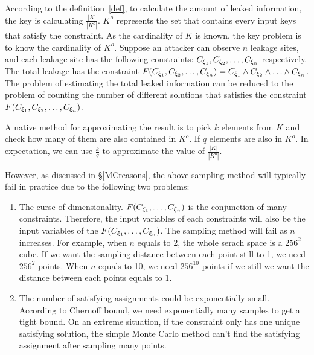 According to the definition~\ref{def}, to calculate the amount of leaked 
information, the key is calculating $\frac{|K|}{|K^o|}$. $K^o$ represents
the set that contains every input keys that satisfy the constraint. As the 
cardinality of $K$ is known, the key problem is to know the cardinality of
$K^o$. Suppose an attacker can observe $n$ leakage sites, and each leakage site has
the following constraints: $C_{{\xi}_{1}}, C_{{\xi}_{2}}, \ldots, C_{{\xi}_{n}}$ respectively. 
The total leakage has the constraint 
$F(C_{{\xi}_{1}},C_{{\xi}_{2}},\ldots,C_{{\xi}_{n}}) = C_{{\xi}_{1}} \land C_{{\xi}_{2}} 
\land \ldots \land C_{{\xi}_{n}}$. The problem of estimating the total leaked information 
can be reduced to the problem of counting the number of different solutions 
that satisfies the constraint $F(C_{{\xi}_{1}},C_{{\xi}_{2}},\ldots,C_{{\xi}_{n}})$. 

A native method for approximating 
the result is to pick $k$ elements from $K$ and check how many of them are also
contained in $K^o$. If $q$ elements are also in $K^o$. In expectation, we can
use $\frac{k}{q}$ to approximate the value of $\frac{|K|}{|K^o|}$.

However, as discussed in \S\ref{MCreasons},
the above sampling method will typically fail in practice due to the following two problems:

\begin{enumerate}
      \item The curse of dimensionality. $F(C_{{\xi}_{1}},\ldots,C_{{\xi}_{n}})$ is the conjunction of many
      constraints. Therefore, the input variables of each constraints will also be 
      the input variables of the  $F(C_{{\xi}_{1}},\ldots,C_{{\xi}_{n}})$. The sampling method will fail as 
      $n$ increases. For example, when $n$ equals to 2, the whole serach space is 
      a $256^2$ cube. If we want the sampling distance between each point still to 1,
      we need $256^2$ points. When $n$ equals to 10, we need $256^{10}$ points if we 
      still we want the distance between each points equals to 1. 

      \item The number of satisfying assignments could be exponentially small.
      According to Chernoff bound, we need exponentially many samples to get 
      a tight bound. On an extreme situation, if the constraint only has one unique
      satisfying solution, the simple Monte Carlo method can't find the satisfying
      assignment after sampling many points.
\end{enumerate}

